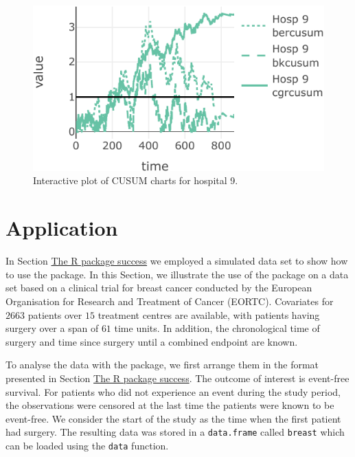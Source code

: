 \begin{figure}
\centering
\includegraphics{RJ-2023-095_files/figure-latex/interplot-static-1.pdf}
\caption{\label{fig:interplot-static}Interactive plot of CUSUM charts for hospital 9.}
\end{figure}

\hypertarget{sec:application}{%
\section{Application}\label{sec:application}}

In Section \protect\hyperlink{sec:Rpkgsuccess}{The R package success} we employed a simulated data set to show how to use the  package. In this Section, we illustrate the use of the  package on a data set based on a clinical trial for breast cancer conducted by the European Organisation for Research and Treatment of Cancer (EORTC). Covariates for \(2663\) patients over \(15\) treatment centres are available, with patients having surgery over a span of \(61\) time units. In addition, the chronological time of surgery and time since surgery until a combined endpoint are known.

To analyse the data with the  package, we first arrange them in the format presented in Section \protect\hyperlink{sec:Rpkgsuccess}{The R package success}. The outcome of interest is event-free survival. For patients who did not experience an event during the study period, the observations were censored at the last time the patients were known to be event-free. We consider the start of the study as the time when the first patient had surgery. The resulting data was stored in a \texttt{data.frame} called \texttt{breast} which can be loaded using the \texttt{data} function.

